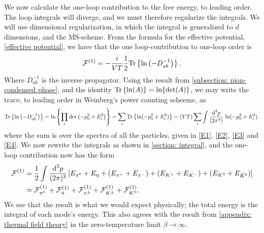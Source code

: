 We now calculate the one-loop contribution to the free energy, to leading order.
The loop integrals will diverge, and we must therefore regularize the integrals.
We will use dimensional regularization, in which the integral is generalized to $d$ dimensions, and the $\overline{\mathrm{MS}}$-scheme.
From the formula for the effective potential, \autoref{effective potential}, we have that the one loop-contribution to one-loop order is 
%
\begin{equation}
    \mathcal{F}^{(1)}
    =
    - \frac{i}{V T} \frac{1}{2}
    \text{Tr} \left\{ \ln\left( - D_{ab}^{-1}\right) \right\}.
\end{equation}
%
Where $D_{ab}^{-1}$ is the inverse propagator.
Using the result from \autoref{subsection: pion-condensed phase}, and the identity $\text{Tr} \left\{ \ln(A) \right\} = \ln\{\det(A)\}$, we may write the trace, to leading order in Weinberg's power counting scheeme, as
%
\begin{equation}
    \text{Tr} \left\{ \ln\left( - D_{ab}^{-1}\right) \right\}
    =
    \ln\left\{\prod_i \det\left( -p_0^2 + E_i^2  \right)  \right\}
    =
    \sum_i \text{Tr} \left\{ \ln(-p_0^2 + E_i^2) \right\}
    =
    (VT) \sum_i \int \frac{\text{d}^4 p}{(2\pi^4)} \,\ln(-p_0^2 + E_i^2).
\end{equation}
%
where the sum is over the spectra of all the particles, given in \autoref{E1}, \autoref{E2}, \autoref{E3} and \autoref{E4}.
We now rewrite the integrals as shown in \autoref{section: integral}, and the one-loop contribution now has the form
%
\begin{align}
    \nonumber
    \mathcal{F}^{(1)} 
     & = 
    \frac{1}{2} 
    \int \frac{\text{d}^3 p}{(2\pi)^3}
    \left[
        E_{\pi^0} + E_\eta + (E_{\pi^+} + E_{\pi^-})
        + (E_{K^+} + E_{K^-})
        + (E_{K^0} + E_{\bar K^0})
    \right] \\
    & = \mathcal{F}^{(1)}_{\pi^0} 
    + \mathcal{F}^{(1)}_\eta 
    + \mathcal{F}^{(1)}_{\pi^\pm}
    + \mathcal{F}^{(1)}_{K^\pm} 
    + \mathcal{F}^{(1)}_{K^0}.
\end{align}
%
We see that the result is what we would expect physically; the total energy is the integral of each mode's energy.
This also agrees with the result from \autoref{appendix: thermal field theory} in the zero-temperature limit $\beta \rightarrow \infty$.

